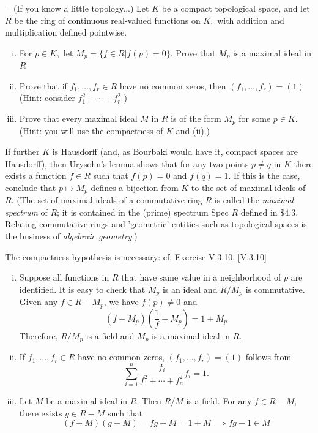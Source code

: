 \documentclass[12pt,letterpaper,boxed]{hmcpset}
\begin{document}
\begin{problem}[4.17]
	$\neg$ (If you know a little topology...) Let $K$ be a compact topological space, and let $R$ be the ring of continuous real-valued functions on $K,$ with addition and multiplication defined pointwise.
	\begin{enumerate}[(i)]
		\item For $p \in K,$ let $M_{p}=\{f \in R | f(p)=0\} .$ Prove that $M_{p}$ is a maximal ideal in $R$
		\item Prove that if $f_{1}, \ldots, f_{r} \in R$ have no common zeros, then $\left(f_{1}, \ldots, f_{r}\right)=(1)$ (Hint: consider $f_{1}^{2}+\cdots+f_{r}^{2}$ )
		\item Prove that every maximal ideal $M$ in $R$ is of the form $M_{p}$ for some $p \in K .$ (Hint:
		you will use the compactness of $K$ and (ii).) 
	\end{enumerate}
	If further $K$ is Hausdorff (and, as Bourbaki would have it, compact spaces are Hausdorff), then Urysohn's lemma shows that for any two points $p \neq q$ in $K$ there exists a function $f \in R$ such that $f(p)=0$ and $f(q)=1 .$ If this is the case, conclude that $p \mapsto M_{p}$ defines a bijection from $K$ to the set of maximal ideals of $R .$ (The set of maximal ideals of a commutative ring $R$ is called the \emph{maximal spectrum} of $R$; it is contained in the (prime) spectrum Spec $R$ defined in $\$ 4.3 .$ Relating commutative rings and 'geometric' entities such as topological spaces is the business of \emph{algebraic geometry}.)
	
	The compactness hypothesis is necessary: cf. Exercise V.3.10. [V.3.10]	
\end{problem}
\begin{solution}
	\begin{enumerate}[(i)]
		\item Suppose all functions in $R$ that have same value in a neighborhood of $p$ are identified. It is easy to check that $M_p$ is an ideal and $R/M_p$ is commutative. Given any $f\in R-M_p$, we have $f(p)\ne0$ and
		\[
		(f+M_p)\left(\frac{1}{f}+M_p\right)=1+M_p
		\]
		Therefore, $R/M_p$ is a field and  $M_{p}$ is a maximal ideal in $R$.
		\item If $f_{1}, \ldots, f_{r} \in R$ have no common zeros, $\left(f_{1}, \ldots, f_{r}\right)=(1)$ follows from
		\[
		\sum_{i=1}^n\frac{f_i}{f_1^2+\cdots+f_n^2}f_i=1.
		\]
		\item Let $M$ be a maximal ideal in $R$. Then $R/M$ is a field. For any $f\in R-M$, there exists $g\in R-M$ such that
		\[
		(f+M)\left(g+M\right)=fg+M=1+M\implies fg-1\in M
		\]
	\end{enumerate}
\end{solution}
\end{document}
